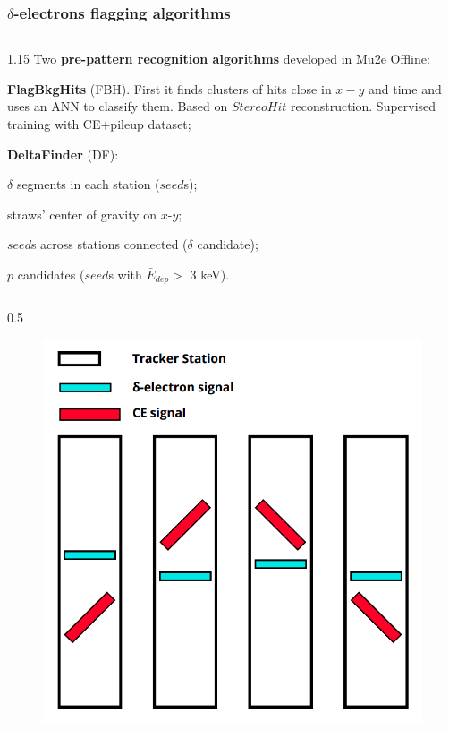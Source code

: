 \documentclass{beamer}
\begin{document}
\begin{frame}
    \frametitle{$\delta$-electrons flagging algorithms}
    \vspace{-1mm}
      \begin{columns}
        \begin{column}{1.15\framewidth}
       {\small Two \textbf{pre-pattern recognition  algorithms} developed in Mu2e Offline:}
    \setlength{\leftmargini}{1.2em}
    \vspace{0.5mm}
    \begin{itemize}
    {\small   
    \item \textbf{FlagBkgHits} (FBH). First it finds clusters of hits close in $x-y$ and time and uses an ANN to classify them. Based on $StereoHit$ reconstruction. Supervised training with CE+pileup dataset;
    \vspace{0.5mm}
    \item \textbf{DeltaFinder} (DF):
    }
    \begin{itemize}
        {\small \item $\delta$ segments in each station ($seed$s);
\item  straws' center of gravity on $x$-$y$; 
\item $seed$s across stations connected ($\delta$ candidate); 
\item $p$ candidates ($seed$s with $\bar{E}_{dep}>$ 3 keV).}
    \end{itemize}
    \end{itemize}
    \end{column}
    \end{columns}
    \vspace{-3mm}
        \begin{columns}
        \begin{column}{0.5\framewidth}
            \begin{figure}[!h]
        \centering
        \hspace*{-2em}
        \includegraphics[width =0.6\columnwidth]{figures/png/Screenshot_20240811_123048.png}

\end{figure}
\end{column}
\end{columns}
\end{frame}
\end{document}

